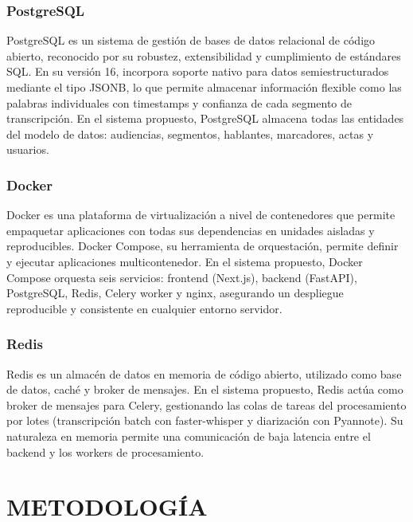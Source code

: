 \documentclass[12pt,a4paper,oneside]{report}
\begin{document}
\subsection{PostgreSQL}

PostgreSQL es un sistema de gestión de bases de datos relacional de código abierto, reconocido por su robustez, extensibilidad y cumplimiento de estándares SQL. En su versión 16, incorpora soporte nativo para datos semiestructurados mediante el tipo JSONB, lo que permite almacenar información flexible como las palabras individuales con timestamps y confianza de cada segmento de transcripción. En el sistema propuesto, PostgreSQL almacena todas las entidades del modelo de datos: audiencias, segmentos, hablantes, marcadores, actas y usuarios.

\subsection{Docker}

Docker es una plataforma de virtualización a nivel de contenedores que permite empaquetar aplicaciones con todas sus dependencias en unidades aisladas y reproducibles. Docker Compose, su herramienta de orquestación, permite definir y ejecutar aplicaciones multicontenedor. En el sistema propuesto, Docker Compose orquesta seis servicios: frontend (Next.js), backend (FastAPI), PostgreSQL, Redis, Celery worker y nginx, asegurando un despliegue reproducible y consistente en cualquier entorno servidor.

\subsection{Redis}

Redis es un almacén de datos en memoria de código abierto, utilizado como base de datos, caché y broker de mensajes. En el sistema propuesto, Redis actúa como broker de mensajes para Celery, gestionando las colas de tareas del procesamiento por lotes (transcripción batch con faster-whisper y diarización con Pyannote). Su naturaleza en memoria permite una comunicación de baja latencia entre el backend y los workers de procesamiento.

\chapter{METODOLOGÍA}
\end{document}
